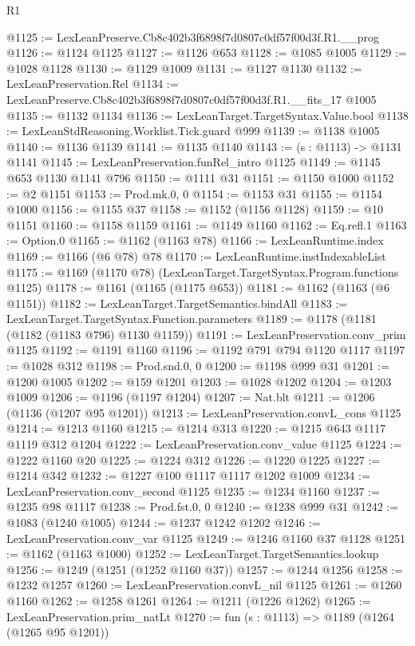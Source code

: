 \begin{lexlean}{R1}
\begin{coremodule}
@1125 := LexLeanPreserve.Cb8c402b3f6898f7d0807c0df57f00d3f.R1.__prog
@1126 := @1124 @1125
@1127 := @1126 @653
@1128 := @1085 @1005
@1129 := @1028 @1128
@1130 := @1129 @1009
@1131 := @1127 @1130
@1132 := LexLeanPreservation.Rel
@1134 := LexLeanPreserve.Cb8c402b3f6898f7d0807c0df57f00d3f.R1.__fits_17 @1005
@1135 := @1132 @1134
@1136 := LexLeanTarget.TargetSyntax.Value.bool
@1138 := LexLeanStdReasoning.Worklist.Tick.guard @999
@1139 := @1138 @1005
@1140 := @1136 @1139
@1141 := @1135 @1140
@1143 := (s : @1113) -> @1131 @1141
@1145 := LexLeanPreservation.funRel_intro @1125
@1149 := @1145 @653 @1130 @1141 @796
@1150 := @1111 @31
@1151 := @1150 @1000
@1152 := @2 @1151
@1153 := Prod.mk.{0, 0}
@1154 := @1153 @31
@1155 := @1154 @1000
@1156 := @1155 @37
@1158 := @1152 (@1156 @1128)
@1159 := @10 @1151
@1160 := @1158 @1159
@1161 := @1149 @1160
@1162 := Eq.refl.{1}
@1163 := Option.{0}
@1165 := @1162 (@1163 @78)
@1166 := LexLeanRuntime.index
@1169 := @1166 (@6 @78) @78
@1170 := LexLeanRuntime.instIndexableList
@1175 := @1169 (@1170 @78) (LexLeanTarget.TargetSyntax.Program.functions @1125)
@1178 := @1161 (@1165 (@1175 @653))
@1181 := @1162 (@1163 (@6 @1151))
@1182 := LexLeanTarget.TargetSemantics.bindAll
@1183 := LexLeanTarget.TargetSyntax.Function.parameters
@1189 := @1178 (@1181 (@1182 (@1183 @796) @1130 @1159))
@1191 := LexLeanPreservation.conv_prim @1125
@1192 := @1191 @1160
@1196 := @1192 @791 @794 @1120 @1117
@1197 := @1028 @312
@1198 := Prod.snd.{0, 0}
@1200 := @1198 @999 @31
@1201 := @1200 @1005
@1202 := @159 @1201
@1203 := @1028 @1202
@1204 := @1203 @1009
@1206 := @1196 (@1197 @1204)
@1207 := Nat.blt
@1211 := @1206 (@1136 (@1207 @95 @1201))
@1213 := LexLeanPreservation.convL_cons @1125
@1214 := @1213 @1160
@1215 := @1214 @313
@1220 := @1215 @643 @1117 @1119 @312 @1204
@1222 := LexLeanPreservation.conv_value @1125
@1224 := @1222 @1160 @20
@1225 := @1224 @312
@1226 := @1220 @1225
@1227 := @1214 @342
@1232 := @1227 @100 @1117 @1117 @1202 @1009
@1234 := LexLeanPreservation.conv_second @1125
@1235 := @1234 @1160
@1237 := @1235 @98 @1117
@1238 := Prod.fst.{0, 0}
@1240 := @1238 @999 @31
@1242 := @1083 (@1240 @1005)
@1244 := @1237 @1242 @1202
@1246 := LexLeanPreservation.conv_var @1125
@1249 := @1246 @1160 @37 @1128
@1251 := @1162 (@1163 @1000)
@1252 := LexLeanTarget.TargetSemantics.lookup
@1256 := @1249 (@1251 (@1252 @1160 @37))
@1257 := @1244 @1256
@1258 := @1232 @1257
@1260 := LexLeanPreservation.convL_nil @1125
@1261 := @1260 @1160
@1262 := @1258 @1261
@1264 := @1211 (@1226 @1262)
@1265 := LexLeanPreservation.prim_natLt
@1270 := fun (s : @1113) => @1189 (@1264 (@1265 @95 @1201))

\end{coremodule}
\end{lexlean}
